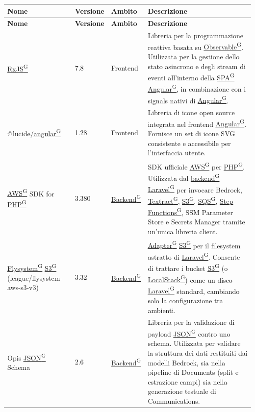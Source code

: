 \documentclass[a4paper,12pt]{article}
\providecommand{\glslink}[2]{\href{https://alittlebyte-19.github.io/Documentazione/glossario.html\#gls-#1}{\underline{#2}\textsuperscript{\scriptsize G}}}
\begin{document}
\renewcommand{\arraystretch}{1.3}
{\small
\setlength{\LTleft}{0pt}
\setlength{\LTright}{0pt}
\begin{longtable}{|p{3cm}|p{1.8cm}|p{2cm}|p{7.7cm}|}
    \hline
    \rowcolor{gray!20}
    \textbf{Nome} & \textbf{Versione} & \textbf{Ambito} & \textbf{Descrizione} \\
    \hline
    \endfirsthead
    \hline
    \rowcolor{gray!20}
    \textbf{Nome} & \textbf{Versione} & \textbf{Ambito} & \textbf{Descrizione} \\
    \hline
    \endhead
    \glslink{rxjs}{RxJS} & 7.8 & Frontend & Libreria per la programmazione reattiva basata su \glslink{observable}{Observable}. Utilizzata per la gestione dello stato asincrono e degli stream di eventi all'interno della \glslink{spa-single-page-application}{SPA} \glslink{angular}{Angular}, in combinazione con i signals nativi di \glslink{angular}{Angular}. \\
    \hline
    @lucide/\glslink{angular}{angular} & 1.28 & Frontend & Libreria di icone open source integrata nel frontend \glslink{angular}{Angular}. Fornisce un set di icone SVG consistente e accessibile per l'interfaccia utente. \\
    \hline
    \glslink{aws}{AWS} SDK for \glslink{php}{PHP} & 3.380 & \glslink{backend}{Backend} & SDK ufficiale \glslink{aws}{AWS} per \glslink{php}{PHP}. Utilizzata dal \glslink{backend}{backend} \glslink{laravel}{Laravel} per invocare Bedrock, \glslink{textract}{Textract}, \glslink{s3-simple-storage-service}{S3}, \glslink{sqs-simple-queue-service}{SQS}, \glslink{step-functions}{Step Functions}, SSM Parameter Store e Secrets Manager tramite un'unica libreria client. \\
    \hline
    \glslink{flysystem}{Flysystem} \glslink{s3-simple-storage-service}{S3} (league/flysystem-aws-s3-v3) & 3.32 & \glslink{backend}{Backend} & \glslink{adapter}{Adapter} \glslink{s3-simple-storage-service}{S3} per il filesystem astratto di \glslink{laravel}{Laravel}. Consente di trattare i bucket \glslink{s3-simple-storage-service}{S3} (o \glslink{localstack}{LocalStack}) come un disco \glslink{laravel}{Laravel} standard, cambiando solo la configurazione tra ambienti. \\
    \hline
    Opis \glslink{json}{JSON} Schema & 2.6 & \glslink{backend}{Backend} & Libreria per la validazione di payload \glslink{json}{JSON} contro uno schema. Utilizzata per validare la struttura dei dati restituiti dai modelli Bedrock, sia nella pipeline di Documents (split e estrazione campi) sia nella generazione testuale di Communications. \\

\end{longtable}}
\end{document}
